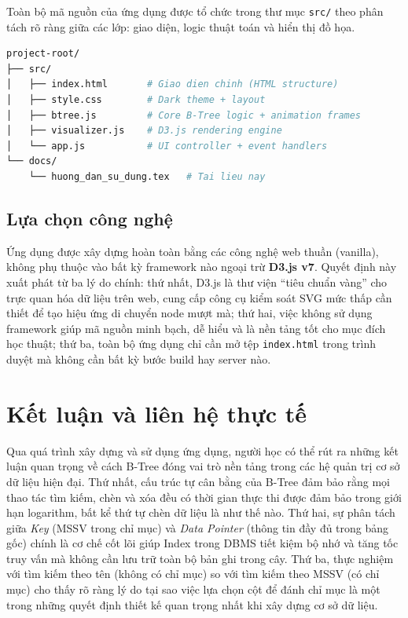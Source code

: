 \documentclass[12pt,a4paper]{article}
\begin{document}
Toàn bộ mã nguồn của ứng dụng được tổ chức trong thư mục \texttt{src/} theo phân tách rõ ràng giữa các lớp: giao diện, logic thuật toán và hiển thị đồ họa.

\begin{lstlisting}[language=bash, caption={Cấu trúc thư mục dự án}]
project-root/
├── src/
│   ├── index.html       # Giao dien chinh (HTML structure)
│   ├── style.css        # Dark theme + layout
│   ├── btree.js         # Core B-Tree logic + animation frames
│   ├── visualizer.js    # D3.js rendering engine
│   └── app.js           # UI controller + event handlers
└── docs/
    └── huong_dan_su_dung.tex   # Tai lieu nay
\end{lstlisting}

\subsection{Lựa chọn công nghệ}

Ứng dụng được xây dựng hoàn toàn bằng các công nghệ web thuần (vanilla), không phụ thuộc vào bất kỳ framework nào ngoại trừ \textbf{D3.js v7}. Quyết định này xuất phát từ ba lý do chính: thứ nhất, D3.js là thư viện ``tiêu chuẩn vàng'' cho trực quan hóa dữ liệu trên web, cung cấp công cụ kiểm soát SVG mức thấp cần thiết để tạo hiệu ứng di chuyển node mượt mà; thứ hai, việc không sử dụng framework giúp mã nguồn minh bạch, dễ hiểu và là nền tảng tốt cho mục đích học thuật; thứ ba, toàn bộ ứng dụng chỉ cần mở tệp \texttt{index.html} trong trình duyệt mà không cần bất kỳ bước build hay server nào.

\section{Kết luận và liên hệ thực tế}

Qua quá trình xây dựng và sử dụng ứng dụng, người học có thể rút ra những kết luận quan trọng về cách B-Tree đóng vai trò nền tảng trong các hệ quản trị cơ sở dữ liệu hiện đại. Thứ nhất, cấu trúc tự cân bằng của B-Tree đảm bảo rằng mọi thao tác tìm kiếm, chèn và xóa đều có thời gian thực thi được đảm bảo trong giới hạn logarithm, bất kể thứ tự chèn dữ liệu là như thế nào. Thứ hai, sự phân tách giữa \emph{Key} (MSSV trong chỉ mục) và \emph{Data Pointer} (thông tin đầy đủ trong bảng gốc) chính là cơ chế cốt lõi giúp Index trong DBMS tiết kiệm bộ nhớ và tăng tốc truy vấn mà không cần lưu trữ toàn bộ bản ghi trong cây. Thứ ba, thực nghiệm với tìm kiếm theo tên (không có chỉ mục) so với tìm kiếm theo MSSV (có chỉ mục) cho thấy rõ ràng lý do tại sao việc lựa chọn cột để đánh chỉ mục là một trong những quyết định thiết kế quan trọng nhất khi xây dựng cơ sở dữ liệu.
\end{document}
